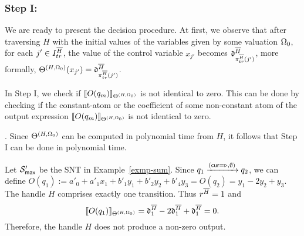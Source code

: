 \subsubsection{Step I:} 
We are ready to present the decision procedure. At first, we observe that  after traversing $H$ with the initial values of the variables given by some valuation $\Omega_0$, for each $j' \in I^{\overline{H}}_{tr}$, the value of the control variable $x_{j'}$ becomes $\mathfrak{d}^{\overline{H}}_{\pi^{\overline{H}}_{tr}(j')}$,  more formally, $\Theta^{(H,\Omega_0)}(x_{j'})=\mathfrak{d}^{\overline{H}}_{\pi^{\overline{H}}_{tr}(j')}$.

In Step I, we check if $\llbracket O(q_m)\rrbracket_{\Theta^{(H,\Omega_0)}}$ is not identical to zero.
This can be done by checking if the constant-atom or the coefficient of some non-constant atom of the output expression $\llbracket O(q_m)\rrbracket_{\Theta^{(H,\Omega_0)}}$ is not identical to zero.
%
\bigskip\\
\medskip

. Since $\Theta^{(H,\Omega_0)}$ can be computed in polynomial time from $H$, it follows that Step I can be done in polynomial time.


\begin{example}\label{exmp-step-1}
Let ${\mathcal{S} }'_{\sf max}$ be the SNT in Example~\ref{exmp-sum}. Since $q_1 \xrightarrow{(\mathsf{cur} = \triangleright, \emptyset)} q_2$, we can define $O(q_1):= a'_0 +  a'_1 x_1 + b'_1 y_1 + b'_2 y_2 + b'_4y_3 = O(q_2) = y_1 - 2y_2 + y_3$.  The handle $H$ comprises exactly one transition. Thus $r^{\overline{H}}=1$ and 
\[\llbracket O(q_1)\rrbracket_{\Theta^{(H, \Omega_0)}} = \mathfrak{d}^{\overline{H}}_1 - 2 \mathfrak{d}^{\overline{H}}_1 + \mathfrak{d}^{\overline{H}}_1=0.\]
Therefore, the handle $H$ does not produce a non-zero output.
\end{example}

